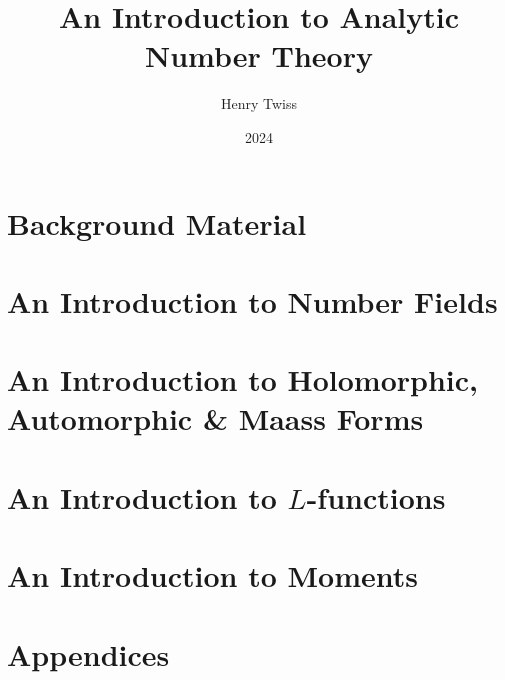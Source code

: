 \documentclass[12pt,oneside]{book}
\title{An Introduction to Analytic Number Theory}
\author{Henry Twiss}
\date{2024}
\begin{document}
\maketitle
\pagestyle{empty}
\tableofcontents
\setcounter{page}{0}
\pagestyle{fancy}

\part{Background Material}
  

\part{An Introduction to Number Fields}
  

\part{An Introduction to Holomorphic, Automorphic \& Maass Forms}
  
  
  
  

\part{An Introduction to \texorpdfstring{$L$}{L}-functions}
  
  
  

\part{An Introduction to Moments}
  
  

\part{Appendices}
  

\printindex


\end{document}
